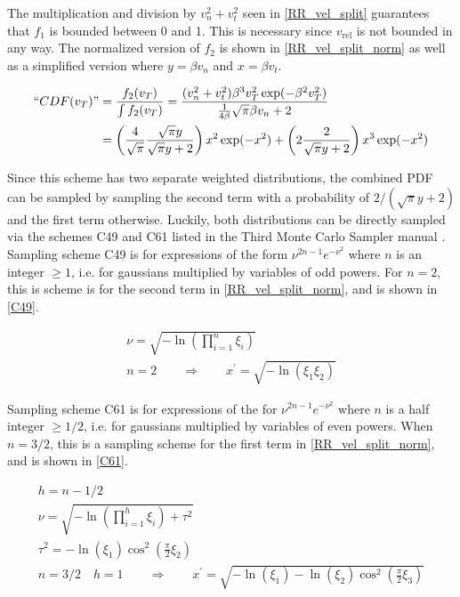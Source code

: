 The multiplication and division by $v_n^2+v_t^2$ seen in \eqref{RR_vel_split} guarantees that $f_1$ is bounded between 0 and 1.  This is necessary since $v_\mathrm{rel}$ is not bounded in any way.  The normalized version of $f_2$ is shown in \eqref{RR_vel_split_norm} as well as a simplified version where $y=\beta v_n$ and $x=\beta v_t$.

\begin{equation}
\label{RR_vel_split_norm}
\begin{split}
``CDF(v_T)" &=  \frac{f_2(v_T)}{\int f_2(v_T)} = \frac{  (v_n^2+v_t^2) \beta^3 v_T^2  \exp ( -\beta^2  v_T^2 ) }{ \frac{1}{4\beta} \sqrt{\pi} \beta v_n +2 } \\
&= \left( \frac{4}{\sqrt{\pi}}  \frac{\sqrt{\pi}y}{\sqrt{\pi}y+2} \right) x^2 \exp(-x^2)  + \left( 2  \frac{2}{\sqrt{\pi}y+2} \right) x^3 \exp(-x^2) \\
\end{split}
\end{equation}

Since this scheme has two separate weighted distributions, the combined PDF can be sampled by sampling the second term with a probability of $2/(\sqrt{\pi}y+2)$ and the first term otherwise.  Luckily, both distributions can be directly sampled via the schemes C49 and C61 listed in the Third Monte Carlo Sampler manual \cite{3rdsampler}.  Sampling scheme C49 is for expressions of the form $\nu^{2n-1}e^{-\nu^2}$ where $n$ is an integer $\ge 1$, i.e. for gaussians multiplied by variables of odd powers.  For $n=2$, this is scheme is for the second term in \eqref{RR_vel_split_norm}, and is shown in \eqref{C49}.

\begin{equation}
\label{C49}
\begin{gathered}
\nu = \sqrt{- \ln \left( \prod_{i=1}^n \xi_i \right)} \\ 
n = 2 \qquad \Rightarrow \qquad x^\prime = \sqrt{- \ln \left( \xi_1 \xi_2 \right)}
\end{gathered}
\end{equation}

Sampling scheme C61 is for expressions of the for $\nu^{2n-1}e^{-\nu^2}$ where $n$ is a half integer $\ge 1/2$, i.e. for gaussians multiplied by variables of even powers.  When $n=3/2$, this is a sampling scheme for the first term in \eqref{RR_vel_split_norm}, and is shown in \eqref{C61}.

\begin{equation}
\label{C61}
\begin{gathered}
h = n-1/2 \\
\nu = \sqrt{- \ln \left( \prod_{i=1}^h \xi_i  \right)+ \tau^2} \\ 
\tau^2 = -\ln(\xi_1) \cos^2(\frac{\pi}{2}\xi_2)\\
n = 3/2 \quad h=1 \qquad \Rightarrow \qquad x^\prime =   \sqrt{- \ln( \xi_1) - \ln(\xi_2) \cos^2(\frac{\pi}{2}\xi_3)}
\end{gathered}
\end{equation}

